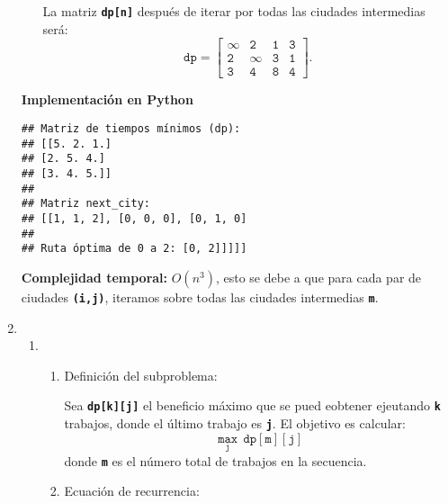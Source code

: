 \begin{enumerate}[label=\color{red}\textbf{\arabic*)}]
\begin{enumerate}[label=\color{red}\alph*)]
        La matriz \textbf{\texttt{dp[n]}} después de iterar por todas las ciudades intermedias será: \[
        \mathbf{\mathtt{dp=\begin{bmatrix} 
              \infty & 2 & 1 & 3\\
              2 & \infty & 3 & 1\\
              3 & 4 & 8 & 4
        \end{bmatrix}. }}
        \] 
    \end{enumerate}
    \textbf{Implementación en Python}

    
\begin{verbatim}
## Matriz de tiempos mínimos (dp):
## [[5. 2. 1.]
## [2. 5. 4.]
## [3. 4. 5.]]
## 
## Matriz next_city:
## [[1, 1, 2], [0, 0, 0], [0, 1, 0]
## 
## Ruta óptima de 0 a 2: [0, 2]]]]]
\end{verbatim}
    \textbf{Complejidad temporal:} $O(n^3)$, esto se debe a que para cada par de ciudades \textbf{\texttt{(i,j)}}, iteramos sobre todas las ciudades intermedias \textbf{\texttt{m}}.

\item {}
        \begin{enumerate}[label=\color{red}\alph*)]
                \item {}

                  \begin{enumerate}[label=\arabic*)]
                    \item Definición del subproblema:

                      Sea \textbf{\texttt{dp[k][j]}} el beneficio máximo que se pued eobtener ejeutando  \textbf{\texttt{k}} trabajos, donde el último trabajo es \textbf{\texttt{j}}. El objetivo es calcular: \[
                        \mathbf{\mathtt{\underset{j}{\max}\,dp[m][j]}}
                      \] donde \textbf{\texttt{m}} es el número total de trabajos en la secuencia.
                    \item Ecuación de recurrencia:


\end{enumerate}
\end{enumerate}
\end{enumerate}
